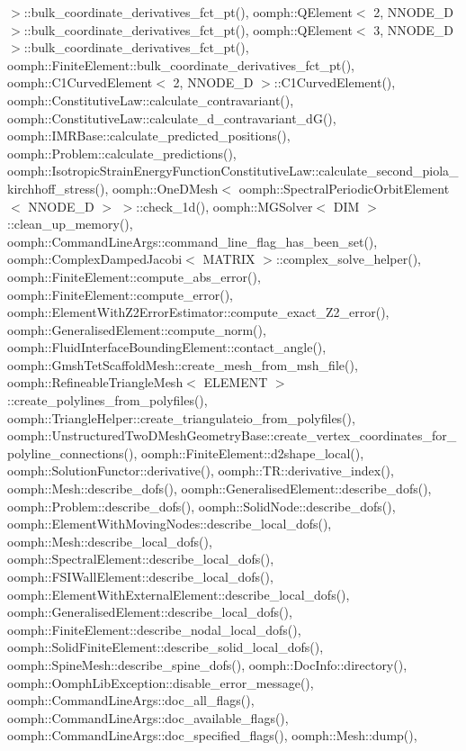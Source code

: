 $>$\+::bulk\+\_\+coordinate\+\_\+derivatives\+\_\+fct\+\_\+pt(), oomph\+::\+Q\+Element$<$ 2, N\+N\+O\+D\+E\+\_\+D $>$\+::bulk\+\_\+coordinate\+\_\+derivatives\+\_\+fct\+\_\+pt(), oomph\+::\+Q\+Element$<$ 3, N\+N\+O\+D\+E\+\_\+D $>$\+::bulk\+\_\+coordinate\+\_\+derivatives\+\_\+fct\+\_\+pt(), oomph\+::\+Finite\+Element\+::bulk\+\_\+coordinate\+\_\+derivatives\+\_\+fct\+\_\+pt(), oomph\+::\+C1\+Curved\+Element$<$ 2, N\+N\+O\+D\+E\+\_\+D $>$\+::\+C1\+Curved\+Element(), oomph\+::\+Constitutive\+Law\+::calculate\+\_\+contravariant(), oomph\+::\+Constitutive\+Law\+::calculate\+\_\+d\+\_\+contravariant\+\_\+d\+G(), oomph\+::\+I\+M\+R\+Base\+::calculate\+\_\+predicted\+\_\+positions(), oomph\+::\+Problem\+::calculate\+\_\+predictions(), oomph\+::\+Isotropic\+Strain\+Energy\+Function\+Constitutive\+Law\+::calculate\+\_\+second\+\_\+piola\+\_\+kirchhoff\+\_\+stress(), oomph\+::\+One\+D\+Mesh$<$ oomph\+::\+Spectral\+Periodic\+Orbit\+Element$<$ N\+N\+O\+D\+E\+\_\+D $>$ $>$\+::check\+\_\+1d(), oomph\+::\+M\+G\+Solver$<$ D\+I\+M $>$\+::clean\+\_\+up\+\_\+memory(), oomph\+::\+Command\+Line\+Args\+::command\+\_\+line\+\_\+flag\+\_\+has\+\_\+been\+\_\+set(), oomph\+::\+Complex\+Damped\+Jacobi$<$ M\+A\+T\+R\+I\+X $>$\+::complex\+\_\+solve\+\_\+helper(), oomph\+::\+Finite\+Element\+::compute\+\_\+abs\+\_\+error(), oomph\+::\+Finite\+Element\+::compute\+\_\+error(), oomph\+::\+Element\+With\+Z2\+Error\+Estimator\+::compute\+\_\+exact\+\_\+\+Z2\+\_\+error(), oomph\+::\+Generalised\+Element\+::compute\+\_\+norm(), oomph\+::\+Fluid\+Interface\+Bounding\+Element\+::contact\+\_\+angle(), oomph\+::\+Gmsh\+Tet\+Scaffold\+Mesh\+::create\+\_\+mesh\+\_\+from\+\_\+msh\+\_\+file(), oomph\+::\+Refineable\+Triangle\+Mesh$<$ E\+L\+E\+M\+E\+N\+T $>$\+::create\+\_\+polylines\+\_\+from\+\_\+polyfiles(), oomph\+::\+Triangle\+Helper\+::create\+\_\+triangulateio\+\_\+from\+\_\+polyfiles(), oomph\+::\+Unstructured\+Two\+D\+Mesh\+Geometry\+Base\+::create\+\_\+vertex\+\_\+coordinates\+\_\+for\+\_\+polyline\+\_\+connections(), oomph\+::\+Finite\+Element\+::d2shape\+\_\+local(), oomph\+::\+Solution\+Functor\+::derivative(), oomph\+::\+T\+R\+::derivative\+\_\+index(), oomph\+::\+Mesh\+::describe\+\_\+dofs(), oomph\+::\+Generalised\+Element\+::describe\+\_\+dofs(), oomph\+::\+Problem\+::describe\+\_\+dofs(), oomph\+::\+Solid\+Node\+::describe\+\_\+dofs(), oomph\+::\+Element\+With\+Moving\+Nodes\+::describe\+\_\+local\+\_\+dofs(), oomph\+::\+Mesh\+::describe\+\_\+local\+\_\+dofs(), oomph\+::\+Spectral\+Element\+::describe\+\_\+local\+\_\+dofs(), oomph\+::\+F\+S\+I\+Wall\+Element\+::describe\+\_\+local\+\_\+dofs(), oomph\+::\+Element\+With\+External\+Element\+::describe\+\_\+local\+\_\+dofs(), oomph\+::\+Generalised\+Element\+::describe\+\_\+local\+\_\+dofs(), oomph\+::\+Finite\+Element\+::describe\+\_\+nodal\+\_\+local\+\_\+dofs(), oomph\+::\+Solid\+Finite\+Element\+::describe\+\_\+solid\+\_\+local\+\_\+dofs(), oomph\+::\+Spine\+Mesh\+::describe\+\_\+spine\+\_\+dofs(), oomph\+::\+Doc\+Info\+::directory(), oomph\+::\+Oomph\+Lib\+Exception\+::disable\+\_\+error\+\_\+message(), oomph\+::\+Command\+Line\+Args\+::doc\+\_\+all\+\_\+flags(), oomph\+::\+Command\+Line\+Args\+::doc\+\_\+available\+\_\+flags(), oomph\+::\+Command\+Line\+Args\+::doc\+\_\+specified\+\_\+flags(), oomph\+::\+Mesh\+::dump(), 